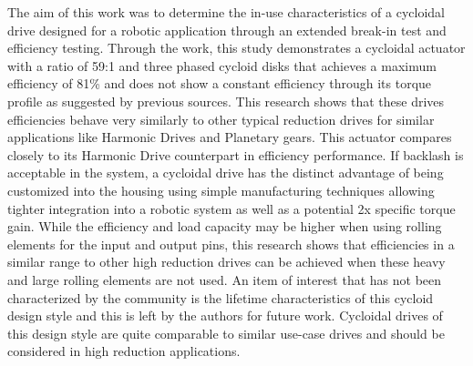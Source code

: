 
The aim of this work was to determine the in-use characteristics of a cycloidal drive designed for a robotic application through an extended break-in test and efficiency testing. Through the work, this study demonstrates a cycloidal actuator with a ratio of 59:1 and three phased cycloid disks that achieves a maximum efficiency of 81\% and does not show a constant efficiency through its torque profile as suggested by previous sources.
This research shows that these drives efficiencies behave very similarly to other typical reduction drives for similar applications like Harmonic Drives and Planetary gears.
This actuator compares closely to its Harmonic Drive counterpart in efficiency performance.
If backlash is acceptable in the system, a cycloidal drive has the distinct advantage of being customized into the housing using simple manufacturing techniques allowing tighter integration into a robotic system as well as a potential 2x specific torque gain.
While the efficiency and load capacity may be higher when using rolling elements for the input and output pins, this research shows that efficiencies in a similar range to other high reduction drives can be achieved when these heavy and large rolling elements are not used.
An item of interest that has not been characterized by the community is the lifetime characteristics of this cycloid design style and this is left by the authors for future work.
Cycloidal drives of this design style are quite comparable to similar use-case drives and should be considered in high reduction applications.

